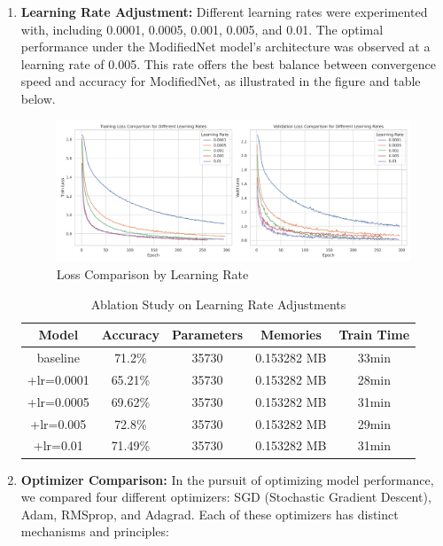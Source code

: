 \documentclass[conference]{IEEEtran}
\begin{document}
	\begin{enumerate}
		\item \textbf{Learning Rate Adjustment:}
		Different learning rates were experimented with, including 0.0001, 0.0005, 0.001, 0.005, and 0.01. The optimal performance under the ModifiedNet model's architecture was observed at a learning rate of 0.005. This rate offers the best balance between convergence speed and accuracy for ModifiedNet, as illustrated in the figure and table below.
		
		\begin{figure}[htbp]
			\centerline{\includegraphics[width=\columnwidth]{images/loss_comparison_lr.png}}
			\caption{Loss Comparison by Learning Rate}
			\label{fig:loss_comparison_lr}
		\end{figure}
		
		\begin{table}[h]
			\centering
			\begin{tabular}{|c|c|c|c|c|}
				\hline
				\textbf{Model} & \textbf{Accuracy} & \textbf{Parameters} & \textbf{Memories} & \textbf{Train Time} \\ \hline
				baseline       & 71.2\%  & 35730 & 0.153282 MB & 33min \\ \hline
				+lr=0.0001     & 65.21\% & 35730 & 0.153282 MB & 28min \\ \hline
				+lr=0.0005     & 69.62\% & 35730 & 0.153282 MB & 31min \\ \hline
				+lr=0.005      & 72.8\%  & 35730 & 0.153282 MB & 29min \\ \hline
				+lr=0.01       & 71.49\% & 35730 & 0.153282 MB & 31min \\ \hline
			\end{tabular}
			\caption{Ablation Study on Learning Rate Adjustments}
			\label{tab:lr_adjustments}
		\end{table}
	
		\item \textbf{Optimizer Comparison:}
		In the pursuit of optimizing model performance, we compared four different optimizers: SGD (Stochastic Gradient Descent), Adam, RMSprop, and Adagrad. Each of these optimizers has distinct mechanisms and principles:
		

\end{enumerate}
\end{document}
